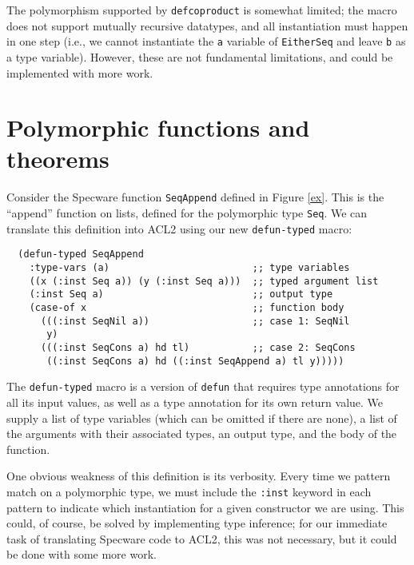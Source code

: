\documentclass[]{eptcs}
\begin{document}
The polymorphism supported by \verb|defcoproduct| is somewhat limited; the macro does not support mutually recursive datatypes, and all instantiation must happen in one step (i.e., we cannot instantiate the \verb|a| variable of \verb|EitherSeq| and leave \verb|b| as a type variable). However, these are not fundamental limitations, and could be implemented with more work.

\section{Polymorphic functions and theorems}
Consider the Specware function \verb|SeqAppend| defined in Figure \ref{ex}. This is the ``append'' function on lists, defined for the polymorphic type \verb|Seq|. We can translate this definition into ACL2 using our new \verb|defun-typed| macro:
\begin{verbatim}
  (defun-typed SeqAppend
    :type-vars (a)                         ;; type variables
    ((x (:inst Seq a)) (y (:inst Seq a)))  ;; typed argument list
    (:inst Seq a)                          ;; output type
    (case-of x                             ;; function body
      (((:inst SeqNil a))                  ;; case 1: SeqNil
       y)
      (((:inst SeqCons a) hd tl)           ;; case 2: SeqCons
       ((:inst SeqCons a) hd ((:inst SeqAppend a) tl y)))))
\end{verbatim}
The \verb|defun-typed| macro is a version of \verb|defun| that requires type annotations for all its input values, as well as a type annotation for its own return value. We supply a list of type variables (which can be omitted if there are none), a list of the arguments with their associated types, an output type, and the body of the function. 

One obvious weakness of this definition is its verbosity. Every time we pattern match on a polymorphic type, we must include the \verb|:inst| keyword in each pattern to indicate which instantiation for a given constructor we are using. This could, of course, be solved by implementing type inference; for our immediate task of translating Specware code to ACL2, this was not necessary, but it could be done with some more work.
\end{document}
